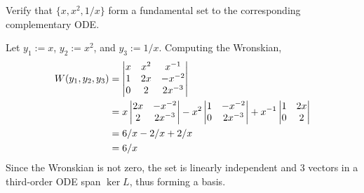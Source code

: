 Verify that $\{x, x^2, 1/x\}$ form a fundamental set to the corresponding complementary ODE. 

\soln Let $y_1 := x$, $y_2 := x^2$, and $y_3 := 1/x$. Computing the Wronskian,
\begin{align*}
    W(y_1, y_2, y_3) &= \begin{vmatrix}{x} & {x^2} & {x^{-1}} \\{1}&{2x}&{-x^{-2}}\\ {0} & {2} & {2x^{-3}}\end{vmatrix}\\
    &= x \begin{vmatrix}{2x} & {-x^{-2}}\\{2}&{2x^{-3}}\end{vmatrix} - x^2 \begin{vmatrix}{1} & {-x^{-2}}\\{0}&{2x^{-3}}\end{vmatrix} + x^{-1} \begin{vmatrix}{1} & {2x}\\{0}&{2}\end{vmatrix}\\
    &= 6/x - 2/x + 2/x\\
    &= 6/x
\end{align*}
Since the Wronskian is not zero, the set is linearly independent and 3 vectors in a third-order ODE span $\ker L$, thus forming a basis.

